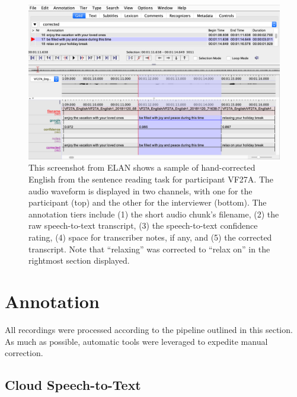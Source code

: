 \begin{figure}[ht]
\begin{center}
\includegraphics[width=4.9in]{figures/ch2_elan.png} 
\caption{This screenshot from ELAN shows a sample of hand-corrected English from the sentence reading task for participant VF27A. The audio waveform is displayed in two channels, with one for the participant (top) and the other for the interviewer (bottom). The annotation tiers include (1) the short audio chunk's filename, (2) the raw speech-to-text transcript, (3) the speech-to-text confidence rating, (4) space for transcriber notes, if any, and (5) the corrected transcript. Note that ``relaxing'' was corrected to ``relax on'' in the rightmost section displayed.}
\label{ch2:fig:elan}
\end{center}
\end{figure}

\section{Annotation}\label{ch2:sec:annotation}
All recordings were processed according to the pipeline outlined in this section. As much as possible, automatic tools were leveraged to expedite manual correction. 

\subsection{Cloud Speech-to-Text}\label{ch2:subsec:stt}

